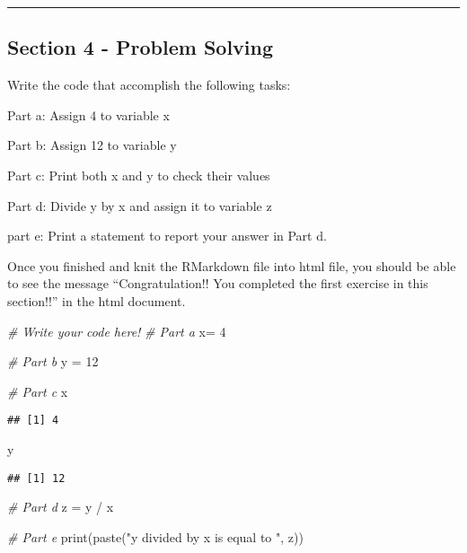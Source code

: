 \documentclass[
]{article}
\newenvironment{Shaded}{\begin{snugshade}}{\end{snugshade}}
\newcommand{\CommentTok}[1]{\textcolor[rgb]{0.56,0.35,0.01}{\textit{#1}}}
\newcommand{\DecValTok}[1]{\textcolor[rgb]{0.00,0.00,0.81}{#1}}
\newcommand{\FunctionTok}[1]{\textcolor[rgb]{0.00,0.00,0.00}{#1}}
\newcommand{\NormalTok}[1]{#1}
\newcommand{\OtherTok}[1]{\textcolor[rgb]{0.56,0.35,0.01}{#1}}
\newcommand{\SpecialCharTok}[1]{\textcolor[rgb]{0.00,0.00,0.00}{#1}}
\newcommand{\StringTok}[1]{\textcolor[rgb]{0.31,0.60,0.02}{#1}}
\begin{document}
\begin{center}\rule{0.5\linewidth}{0.5pt}\end{center}

\hypertarget{section-4---problem-solving}{%
\subsection{Section 4 - Problem
Solving}\label{section-4---problem-solving}}

Write the code that accomplish the following tasks:

Part a: Assign 4 to variable x

Part b: Assign 12 to variable y

Part c: Print both x and y to check their values

Part d: Divide y by x and assign it to variable z

part e: Print a statement to report your answer in Part d.

Once you finished and knit the RMarkdown file into html file, you should
be able to see the message ``Congratulation!! You completed the first
exercise in this section!!'' in the html document.

\begin{Shaded}
\begin{Highlighting}[]
\CommentTok{\# Write your code here!}
\CommentTok{\# Part a}
\NormalTok{x}\OtherTok{=} \DecValTok{4}

\CommentTok{\# Part b}
\NormalTok{y }\OtherTok{=} \DecValTok{12} 

\CommentTok{\# Part c}
\NormalTok{x}
\end{Highlighting}
\end{Shaded}

\begin{verbatim}
## [1] 4
\end{verbatim}

\begin{Shaded}
\begin{Highlighting}[]
\NormalTok{y}
\end{Highlighting}
\end{Shaded}

\begin{verbatim}
## [1] 12
\end{verbatim}

\begin{Shaded}
\begin{Highlighting}[]
\CommentTok{\# Part d}
\NormalTok{z }\OtherTok{=}\NormalTok{ y }\SpecialCharTok{/}\NormalTok{ x }

\CommentTok{\# Part e}
\FunctionTok{print}\NormalTok{(}\FunctionTok{paste}\NormalTok{(}\StringTok{"y divided by x is equal to "}\NormalTok{, z))}
\end{Highlighting}
\end{Shaded}
\end{document}
